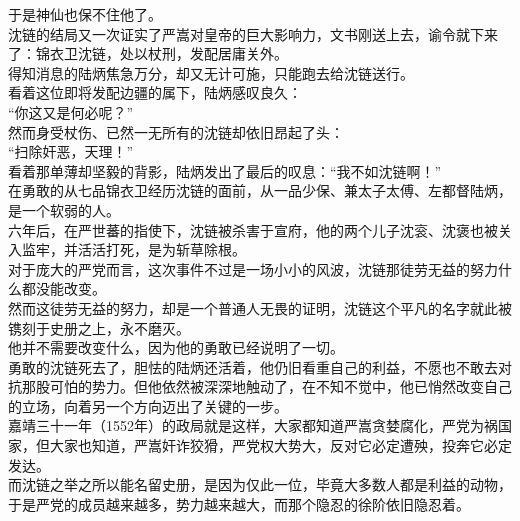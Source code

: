 \begin{multicols}{\theparacolNo}
于是神仙也保不住他了。\\

沈链的结局又一次证实了严嵩对皇帝的巨大影响力，文书刚送上去，谕令就下来了：锦衣卫沈链，处以杖刑，发配居庸关外。\\

得知消息的陆炳焦急万分，却又无计可施，只能跑去给沈链送行。\\

看着这位即将发配边疆的属下，陆炳感叹良久：\\

“你这又是何必呢？”\\

然而身受杖伤、已然一无所有的沈链却依旧昂起了头：\\

“扫除奸恶，天理！”\\

看着那单薄却坚毅的背影，陆炳发出了最后的叹息：“我不如沈链啊！”\\

在勇敢的从七品锦衣卫经历沈链的面前，从一品少保、兼太子太傅、左都督陆炳，是一个软弱的人。\\

六年后，在严世蕃的指使下，沈链被杀害于宣府，他的两个儿子沈衮、沈褒也被关入监牢，并活活打死，是为斩草除根。\\

对于庞大的严党而言，这次事件不过是一场小小的风波，沈链那徒劳无益的努力什么都没能改变。\\

然而这徒劳无益的努力，却是一个普通人无畏的证明，沈链这个平凡的名字就此被镌刻于史册之上，永不磨灭。\\

他并不需要改变什么，因为他的勇敢已经说明了一切。\\

勇敢的沈链死去了，胆怯的陆炳还活着，他仍旧看重自己的利益，不愿也不敢去对抗那股可怕的势力。但他依然被深深地触动了，在不知不觉中，他已悄然改变自己的立场，向着另一个方向迈出了关键的一步。\\

嘉靖三十一年（1552年）的政局就是这样，大家都知道严嵩贪婪腐化，严党为祸国家，但大家也知道，严嵩奸诈狡猾，严党权大势大，反对它必定遭殃，投奔它必定发达。\\

而沈链之举之所以能名留史册，是因为仅此一位，毕竟大多数人都是利益的动物，于是严党的成员越来越多，势力越来越大，而那个隐忍的徐阶依旧隐忍着。\\


\end{multicols}
